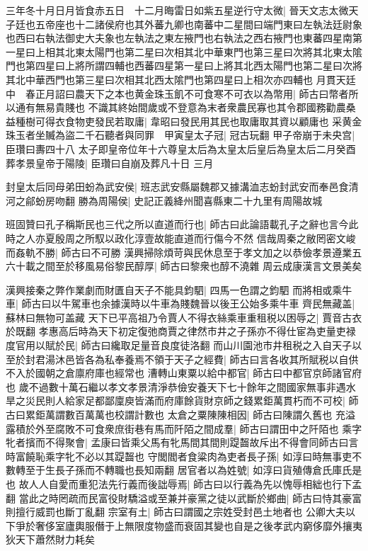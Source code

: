 三年冬十月日月皆食赤五日　十二月晦雷日如紫五星逆行守太微|{
	晉天文志太微天子廷也五帝座也十二諸侯府也其外蕃九卿也南蕃中二星間曰端門東曰左執法廷尉象也西曰右執法御史大夫象也左執法之東左掖門也右執法之西右掖門也東蕃四星南第一星曰上相其北東太陽門也第二星曰次相其北中華東門也第三星曰次將其北東太隂門也第四星曰上將所謂四輔也西蕃四星第一星曰上將其北西太陽門也第二星曰次將其北中華西門也第三星曰次相其北西太隂門也第四星曰上相次亦四輔也}
月貫天廷中　春正月詔曰農天下之本也黄金珠玉飢不可食寒不可衣以為幣用|{
	師古曰幣者所以通有無易貴賤也}
不識其終始間歲或不登意為末者衆農民寡也其令郡國務勸農桑益種樹可得衣食物吏發民若取庸|{
	韋昭曰發民用其民也取庸取其資以顧庸也}
采黄金珠玉者坐贓為盜二千石聽者與同罪　甲寅皇太子冠|{
	冠古玩翻}
甲子帝崩于未央宫|{
	臣瓚曰夀四十八}
太子即皇帝位年十六尊皇太后為太皇太后皇后為皇太后二月癸酉葬孝景皇帝于陽陵|{
	臣瓚曰自崩及葬凡十日}
三月

封皇太后同母弟田蚡為武安侯|{
	班志武安縣屬魏郡又據溝洫志蚡封武安而奉邑食清河之鄃蚡房吻翻}
勝為周陽侯|{
	史記正義絳州聞喜縣東二十九里有周陽故城}


班固贊曰孔子稱斯民也三代之所以直道而行也|{
	師古曰此論語載孔子之辭也言今此時之人亦夏殷周之所馭以政化淳壹故能直道而行傷今不然}
信哉周秦之敝罔密文峻而姦軌不勝|{
	師古曰不可勝}
漢興掃除煩苛與民休息至于孝文加之以恭儉孝景遵業五六十載之間至於移風易俗黎民醇厚|{
	師古曰黎衆也醇不澆雜}
周云成康漢言文景美矣

漢興接秦之弊作業劇而財匱自天子不能具鈞駟|{
	四馬一色謂之鈞駟}
而將相或乘牛車|{
	師古曰以牛駕車也余據漢時以牛車為賤魏晉以後王公始多乘牛車}
齊民無藏盖|{
	蘇林曰無物可盖藏}
天下已平高祖乃令賈人不得衣絲乘車重租税以困辱之|{
	賈音古衣於既翻}
孝惠高后時為天下初定復弛商賈之律然市井之子孫亦不得仕宦為吏量吏禄度官用以賦於民|{
	師古曰纔取足量音良度徒洛翻}
而山川園池市井租税之入自天子以至於封君湯沐邑皆各為私奉養焉不領于天子之經費|{
	師古曰言各收其所賦税以自供不入於國朝之倉廪府庫也經常也}
漕轉山東粟以給中都官|{
	師古曰中都官京師諸官府也}
歲不過數十萬石繼以孝文孝景清淨恭儉安養天下七十餘年之間國家無事非遇水旱之災民則人給家足都鄙廩庾皆滿而府庫餘貨財京師之錢累鉅萬貫朽而不可校|{
	師古曰累鉅萬謂數百萬萬也校謂計數也}
太倉之粟陳陳相因|{
	師古曰陳謂久舊也}
充溢露積於外至腐敗不可食衆庶街巷有馬而阡陌之間成羣|{
	師古曰謂田中之阡陌也}
乘字牝者擯而不得聚會|{
	孟康曰皆乘父馬有牝馬間其間則踶齧故斥出不得會同師古曰言時富饒恥乘字牝不必以其踶齧也}
守閭閻者食粱肉為吏者長子孫|{
	如淳曰時無事吏不數轉至于生長子孫而不轉職也長知兩翻}
居官者以為姓號|{
	如淳曰貨殖傳倉氏庫氏是也}
故人人自愛而重犯法先行義而後詘辱焉|{
	師古曰以行義為先以愧辱相絀也行下孟翻}
當此之時罔疏而民富役財驕溢或至兼并豪黨之徒以武斷於鄉曲|{
	師古曰恃其豪富則擅行威罰也斷丁亂翻}
宗室有土|{
	師古曰謂國之宗姓受封邑土地者也}
公卿大夫以下爭於奢侈室廬輿服僭于上無限度物盛而衰固其變也自是之後孝武内窮侈靡外攘夷狄天下蕭然財力耗矣

